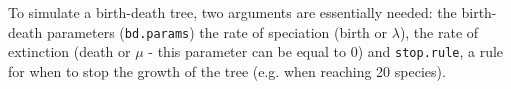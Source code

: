 \documentclass[12pt,letterpaper]{article}
\begin{document}
To simulate a birth-death tree, two arguments are essentially needed: the birth-death parameters (\texttt{bd.params}) the rate of speciation (birth or $\lambda$), the rate of extinction (death or $\mu$ - this parameter can be equal to 0) and \texttt{stop.rule}, a rule for when to stop the growth of the tree (e.g. when reaching 20 species).







\end{document}
